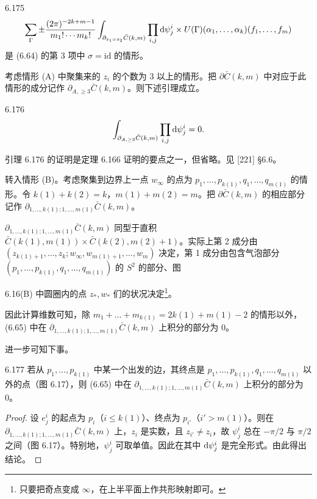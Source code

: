 \begin{lemma}{6.175}
  \[
    \sum_\Gamma\pm\frac{(2\pi)^{-2k+m-1}}{m_1!\cdots m_k!}\int_{\partial_{z_1=z_2}\bar C(k,m)}\prod_{i,j}\mathrm{d}\psi^i_j\times U(\Gamma)(\alpha_1,\dots,\alpha_k)(f_1,\dots,f_m)
  \]
  是 (6.64) 的第 3 项中 $\sigma=\mathrm{id}$ 的情形。
\end{lemma}

考虑情形 (A) 中聚集来的 $z_i$ 的个数为 3 以上的情形。把 $\partial\bar C(k,m)$ 中对应于此情形的成分记作 $\partial_{A,\ge3}\bar C(k,m)$。则下述引理成立。

\begin{lemma}{6.176}
  \[
    \int_{\partial_{A,\ge3}\bar C(k,m)}\prod_{i,j}\mathrm{d}\psi^i_j=0.
  \]
\end{lemma}

引理 6.176 的证明是定理 6.166 证明的要点之一，但省略。见 [221] §6.6。

转入情形 (B)。考虑聚集到边界上一点 $w_\infty$ 的点为 $p_1,\dots,p_{k(1)},q_1,\dots,q_{m(1)}$ 的情形。令 $k(1)+k(2)=k$，$m(1)+m(2)=m$。把 $\partial\bar C(k,m)$ 的相应部分记作 $\partial_{1,\dots,k(1);1,\dots,m(1)}\bar C(k,m)$。

$\partial_{1,\dots,k(1);1,\dots,m(1)}\bar C(k,m)$ 同型于直积 $\bar C(k(1),m(1))\times\bar C(k(2),m(2)+1)$。实际上第 2 成分由 $(z_{k(1)+1},\dots,z_k;w_\infty,w_{m(1)+1},\dots,w_m)$ 决定，第 1 成分由包含气泡部分 $(p_1,\dots,p_{k(1)},q_1,\dots,q_{m(1)})$ 的 $S^2$ 的部分、图

6.16(B) 中圆圈内的点 $z_*,w_*$ 们的状况决定\footnote{只要把奇点变成 $\infty$，在上半平面上作共形映射即可。}。

因此计算维数可知，除 $m_1+\dots+m_{k(1)}=2k(1)+m(1)-2$ 的情形以外，(6.65) 中在 $\partial_{1,\dots,k(1);1,\dots,m(1)}\bar C(k,m)$ 上积分的部分为 0。

进一步可知下事。

\begin{lemma*}{6.177}
  若从 $p_1,\dots,p_{k(1)}$ 中某一个出发的边，其终点是 $p_1,\dots,p_{k(1)},q_1,\dots,q_{m(1)}$ 以外的点（图 6.17），则 (6.65) 中在 $\partial_{1,\dots,k(1);1,\dots,m(1)}\bar C(k,m)$ 上积分的部分为 0。
\end{lemma*}
\begin{proof}
  设 $e^i_j$ 的起点为 $p_i$（$i\le k(1)$）、终点为 $p_{i'}$（$i'>m(1)$）。则在 $\partial_{1,\dots,k(1);1,\dots,m(1)}\bar C(k,m)$ 上，$z_i$ 是实数，且 $z_{i'}\neq z_i$，故 $\psi^i_j$ 总在 $-\pi/2$ 与 $\pi/2$ 之间（图 6.17）。特别地，$\psi^i_j$ 可取单值。因此在其中 $\mathrm{d}\psi^i_j$ 是完全形式。由此得出结论。
\end{proof}

